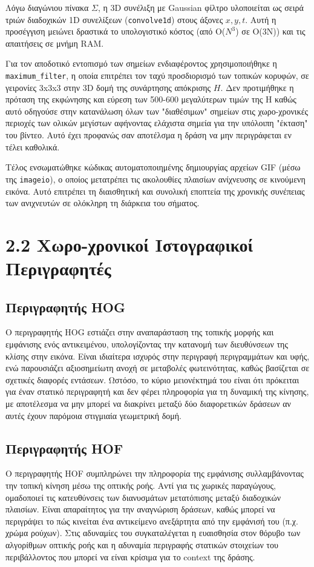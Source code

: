 \documentclass[12pt]{article}
\begin{document}
\hspace{0.6cm}Λόγω διαγώνιου πίνακα $\Sigma$, η 3D συνέλιξη με Gaussian φίλτρο υλοποιείται ως σειρά τριών διαδοχικών 1D συνελίξεων (\texttt{convolve1d}) στους άξονες $x, y, t$. Αυτή η προσέγγιση μειώνει δραστικά το υπολογιστικό κόστος (από Ο($Ν^3$) σε Ο(3Ν)) και τις απαιτήσεις σε μνήμη RAM.

Για τον αποδοτικό εντοπισμό των σημείων ενδιαφέροντος χρησιμοποιήθηκε η \texttt{maximum\_filter}, η οποία επιτρέπει τον ταχύ προσδιορισμό των τοπικών κορυφών, σε γειρονίες 3x3x3 στην 3D δομή της συνάρτησης απόκρισης $H$. Δεν προτιμήθηκε η πρόταση της εκφώνησης και εύρεση των 500-600 μεγαλύτερων τιμών της Η καθώς αυτό οδηγούσε στην κατανάλωση όλων των "διαθέσιμων" σημείων στις χωρο-χρονικές περιοχές των ολικών μεγίστων αφήνοντας ελάχιστα σημεία για την υπόλοιπη "έκταση" του βίντεο. Αυτό έχει προφανώς σαν αποτέλσμα η δράση να μην περιγράφεται εν τέλει καθολικά.

Τέλος ενσωματώθηκε κώδικας αυτοματοποιημένης δημιουργίας αρχείων GIF (μέσω της \texttt{imageio}), ο οποίος μετατρέπει τις ακολουθίες πλαισίων ανίχνευσης σε κινούμενη εικόνα. Αυτό επιτρέπει τη διαισθητική και συνολική εποπτεία της χρονικής συνέπειας των ανιχνευτών σε ολόκληρη τη διάρκεια του σήματος.


\section*{2.2 Χωρο-χρονικοί Ιστογραφικοί Περιγραφητές}

\subsection*{Περιγραφητής HOG}
\hspace{0.6cm}Ο περιγραφητής HOG εστιάζει στην αναπαράσταση της τοπικής μορφής και εμφάνισης ενός αντικειμένου, υπολογίζοντας την κατανομή των διευθύνσεων της κλίσης στην εικόνα. Είναι ιδιαίτερα ισχυρός στην περιγραφή περιγραμμάτων και υφής, ενώ παρουσιάζει αξιοσημείωτη ανοχή σε μεταβολές φωτεινότητας, καθώς βασίζεται σε σχετικές διαφορές εντάσεων. Ωστόσο, το κύριο μειονέκτημά του είναι ότι πρόκειται για έναν στατικό περιγραφητή και δεν φέρει πληροφορία για τη δυναμική της κίνησης, με αποτέλεσμα να μην μπορεί να διακρίνει μεταξύ δύο διαφορετικών δράσεων αν αυτές έχουν παρόμοια στιγμιαία γεωμετρική δομή.

\subsection*{Περιγραφητής HOF}
\hspace{0.6cm}Ο περιγραφητής HOF συμπληρώνει την πληροφορία της εμφάνισης συλλαμβάνοντας την τοπική κίνηση μέσω της οπτικής ροής. Αντί για τις χωρικές παραγώγους, ομαδοποιεί τις κατευθύνσεις των διανυσμάτων μετατόπισης μεταξύ διαδοχικών πλαισίων. Είναι απαραίτητος για την αναγνώριση δράσεων, καθώς μπορεί να περιγράψει το πώς κινείται ένα αντικείμενο ανεξάρτητα από την εμφάνισή του (π.χ. χρώμα ρούχων). Στις αδυναμίες του συγκαταλέγεται η ευαισθησία στον θόρυβο των αλγορίθμων οπτικής ροής και η αδυναμία περιγραφής στατικών στοιχείων του περιβάλλοντος που μπορεί να είναι κρίσιμα για το context της δράσης.
\end{document}
